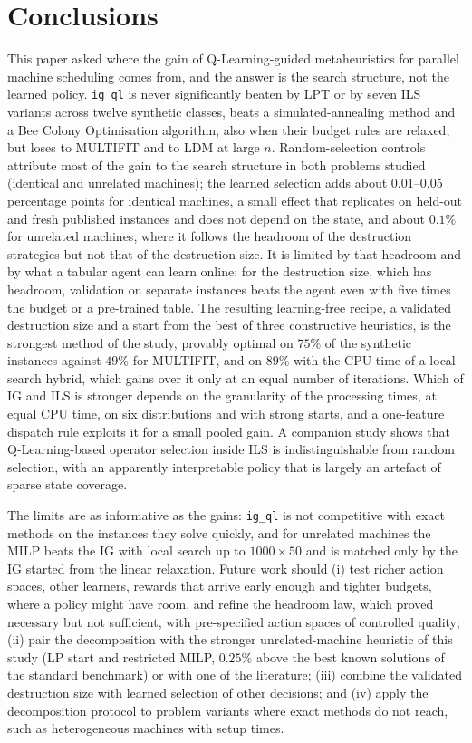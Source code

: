 \documentclass[final,3p,times,11pt,authoryear]{elsarticle}
\begin{document}
\section{Conclusions}
\label{sec:conclusions}

This paper asked where the gain of Q-Learning-guided metaheuristics for parallel
machine scheduling comes from, and the answer is the search structure, not the
learned policy. \texttt{ig\_ql} is never significantly beaten by LPT or by seven
ILS variants across twelve synthetic classes, beats a simulated-annealing method
and a Bee Colony Optimisation algorithm, also when their budget rules are relaxed,
but loses to MULTIFIT and to LDM at large $n$. Random-selection controls attribute
most of the gain to the search structure in both problems studied (identical and
unrelated machines); the learned selection adds about $0.01$--$0.05$ percentage
points for identical machines, a small effect that replicates on held-out and fresh
published instances and does not depend on the state, and about $0.1\%$ for
unrelated machines, where it follows the headroom of the destruction strategies but not that of the destruction size. It is limited by
that headroom and by what a tabular agent can learn online: for the destruction
size, which has headroom, validation on separate instances beats the agent even with
five times the budget or a pre-trained table. The resulting learning-free recipe,
a validated destruction size and a start from the best of three constructive
heuristics, is the strongest method of the study, provably optimal on $75\%$ of the
synthetic instances against $49\%$ for MULTIFIT, and on $89\%$ with the CPU time of a
local-search hybrid, which gains over it only at an equal number of iterations. Which of IG and ILS is stronger
depends on the granularity of the processing times, at equal CPU time, on six
distributions and with strong starts, and a one-feature dispatch rule exploits it
for a small pooled gain. A companion study shows that Q-Learning-based operator
selection inside ILS is indistinguishable from random selection, with an apparently
interpretable policy that is largely an artefact of sparse state coverage.

The limits are as informative as the gains: \texttt{ig\_ql} is not competitive with
exact methods on the instances they solve quickly, and for unrelated machines the
MILP beats the IG with local search up to $1000\times50$ and is matched only by the IG started from the linear relaxation. Future work should
(i) test richer action spaces, other learners, rewards that arrive early enough and tighter budgets, where a policy
might have room, and refine the headroom law, which proved necessary but not sufficient, with pre-specified action spaces of
controlled quality; (ii) pair the decomposition with the stronger unrelated-machine heuristic of this study (LP start and restricted MILP, $0.25\%$ above the best known solutions of the standard benchmark) or with one of the literature; (iii) combine the validated destruction size with learned
selection of other decisions; and (iv) apply the decomposition protocol to problem
variants where exact methods do not reach, such as heterogeneous machines with
setup times.
\end{document}
